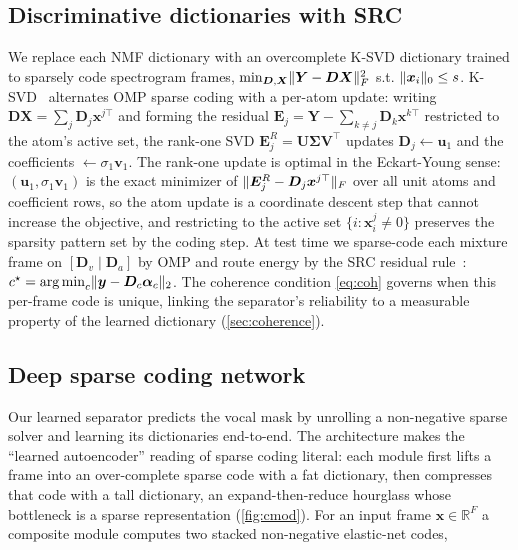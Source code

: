 \documentclass{article}
\DeclarePairedDelimiter{\norm}{\lVert}{\rVert}
\DeclareMathOperator*{\argmin}{arg\,min}
\newcommand{\R}{\mathbb{R}}
\newcommand{\D}{\bm{D}}
\newcommand{\Y}{\bm{Y}}
\newcommand{\X}{\bm{X}}
\newcommand{\Ev}{\bm{E}}
\newcommand{\xv}{\bm{x}}
\newcommand{\yv}{\bm{y}}
\newcommand{\av}{\bm{\alpha}}
\begin{document}
\subsection{Discriminative dictionaries with SRC}
\label{sec:ksvd}
We replace each NMF dictionary with an overcomplete K-SVD dictionary trained to
sparsely code spectrogram frames, $\min_{\D,\X}\norm{\Y-\D\X}_F^2$ s.t.
$\norm{\xv_i}_0\le s$. K-SVD~\cite{aharon2006ksvd} alternates OMP sparse coding with
a per-atom update: writing $\D\X=\sum_j\D_j\bm x^{j\top}$ and forming the residual
$\Ev_{j}=\Y-\sum_{k\ne j}\D_k\bm x^{k\top}$ restricted to the atom's active set, the
rank-one SVD $\Ev_j^{R}=\bm U\bm\Sigma\bm V^\top$ updates $\D_j\leftarrow\bm u_1$ and
the coefficients $\leftarrow\sigma_1\bm v_1$. The rank-one update is optimal in the
Eckart-Young sense: $(\bm u_1,\sigma_1\bm v_1)$ is the exact minimizer of
$\norm{\Ev_j^{R}-\D_j\bm x^{j\top}}_F$ over all unit atoms and coefficient rows, so
the atom update is a coordinate descent step that cannot increase the objective,
and restricting to the active set $\{i:\bm x^{j}_i\!\ne\!0\}$ preserves the sparsity
pattern set by the coding step. At test time we sparse-code each mixture frame on
$[\D_v\mid\D_a]$ by OMP and route energy by the SRC residual
rule~\cite{wright2009src}: $c^\star=\argmin_c\norm{\yv-\D_c\av_c}_2$. The coherence
condition \cref{eq:coh} governs when this per-frame code is unique, linking the
separator's reliability to a measurable property of the learned dictionary
(\cref{sec:coherence}).

\subsection{Deep sparse coding network}
\label{sec:scn}
Our learned separator predicts the vocal mask by unrolling a non-negative sparse
solver and learning its dictionaries end-to-end. The architecture makes the
``learned autoencoder'' reading of sparse coding literal: each module first lifts a
frame into an over-complete sparse code with a fat dictionary, then compresses that
code with a tall dictionary, an expand-then-reduce hourglass whose bottleneck is a
sparse representation (\cref{fig:cmod}). For an input frame $\xv\in\R^F$ a
composite module computes two stacked non-negative elastic-net codes,
\end{document}
